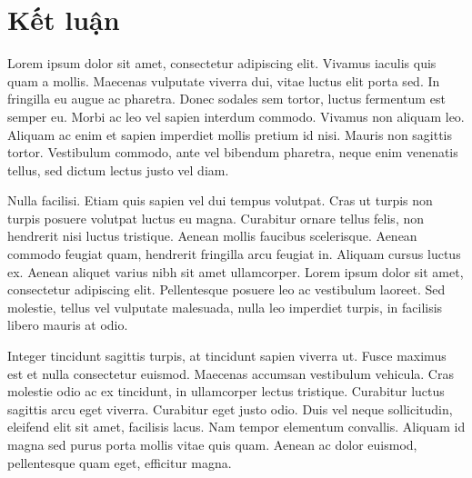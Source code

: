 \chapter*{Kết luận}
Lorem ipsum dolor sit amet, consectetur adipiscing elit. Vivamus iaculis quis quam a mollis. Maecenas vulputate viverra dui, vitae luctus elit porta sed. In fringilla eu augue ac pharetra. Donec sodales sem tortor, luctus fermentum est semper eu. Morbi ac leo vel sapien interdum commodo. Vivamus non aliquam leo. Aliquam ac enim et sapien imperdiet mollis pretium id nisi. Mauris non sagittis tortor. Vestibulum commodo, ante vel bibendum pharetra, neque enim venenatis tellus, sed dictum lectus justo vel diam.\par
Nulla facilisi. Etiam quis sapien vel dui tempus volutpat. Cras ut turpis non turpis posuere volutpat luctus eu magna. Curabitur ornare tellus felis, non hendrerit nisi luctus tristique. Aenean mollis faucibus scelerisque. Aenean commodo feugiat quam, hendrerit fringilla arcu feugiat in. Aliquam cursus luctus ex. Aenean aliquet varius nibh sit amet ullamcorper. Lorem ipsum dolor sit amet, consectetur adipiscing elit. Pellentesque posuere leo ac vestibulum laoreet. Sed molestie, tellus vel vulputate malesuada, nulla leo imperdiet turpis, in facilisis libero mauris at odio.\par
Integer tincidunt sagittis turpis, at tincidunt sapien viverra ut. Fusce maximus est et nulla consectetur euismod. Maecenas accumsan vestibulum vehicula. Cras molestie odio ac ex tincidunt, in ullamcorper lectus tristique. Curabitur luctus sagittis arcu eget viverra. Curabitur eget justo odio. Duis vel neque sollicitudin, eleifend elit sit amet, facilisis lacus. Nam tempor elementum convallis. Aliquam id magna sed purus porta mollis vitae quis quam. Aenean ac dolor euismod, pellentesque quam eget, efficitur magna.\par
